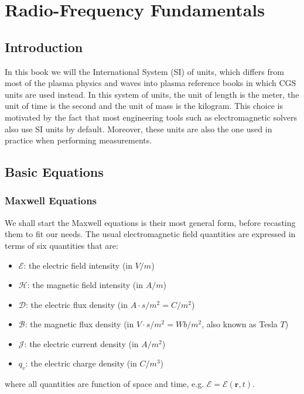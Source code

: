 \chapter{Radio-Frequency Fundamentals}
\section{Introduction}
In this book we will the International System (SI) of units, which differs from most of the plasma physics and waves into plasma reference books in which CGS units are used instead. In this system of units, the unit of length is the meter, the unit of time is the second and the unit of mass is the kilogram. This choice is motivated by the fact that most engineering tools such as electromagnetic solvers also use SI units by default. Moreover, these units are also the one used in practice when performing measurements. 

\section{Basic Equations}
\subsection{Maxwell Equations}
We shall start the Maxwell equations is their most general form, before recasting them to fit our needs. The usual electromagnetic field quantities are expressed in terms of six quantities that are:
\begin{itemize}
 \item $\boldsymbol{\mathcal{E}}$: the electric field intensity (in $V/m$)
 \item $\boldsymbol{\mathcal{H}}$: the magnetic field intensity (in $A/m$)
 \item $\boldsymbol{\mathcal{D}}$: the electric flux density (in $A\cdot s/m^2=C/m^2$)
 \item $\boldsymbol{\mathcal{B}}$: the magnetic flux density (in $V\cdot s/m^2=Wb/m^2$, also known as Tesla $T$)
 \item $\boldsymbol{\mathcal{J}}$: the electric current density (in $A/m^2$)
 \item $q_v$: the electric charge density (in $C/m^3$)
\end{itemize}
where all quantities are function of space and time, e.g. $\boldsymbol{\mathcal{E}}=\boldsymbol{\mathcal{E}}(\mathbf{r},t)$.

